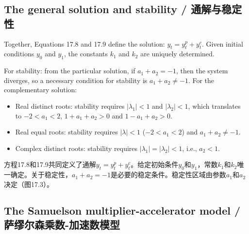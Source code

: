 \subsection{The general solution and stability / 通解与稳定性}

\begin{original}
Together, Equations 17.8 and 17.9 define the solution: $y_t = y_t^p + y_t^c$. Given initial conditions $y_0$ and $y_1$, the constants $k_1$ and $k_2$ are uniquely determined.

For stability: from the particular solution, if $a_1 + a_2 = -1$, then the system diverges, so a necessary condition for stability is $a_1 + a_2 \neq -1$. For the complementary solution:
\begin{itemize}
\item Real distinct roots: stability requires $|\lambda_1| < 1$ and $|\lambda_2| < 1$, which translates to $-2 < a_1 < 2$, $1 + a_1 + a_2 > 0$ and $1 - a_1 + a_2 > 0$.
\item Real equal roots: stability requires $|\lambda| < 1$ ($-2 < a_1 < 2$) and $a_1 + a_2 \neq -1$.
\item Complex distinct roots: stability requires $|\lambda_1| = |\lambda_2| < 1$, i.e., $a_2 < 1$.
\end{itemize}
\end{original}
\begin{translation}
方程17.8和17.9共同定义了通解$y_t = y_t^p + y_t^c$。给定初始条件$y_0$和$y_1$，常数$k_1$和$k_2$唯一确定。关于稳定性，$a_1 + a_2 = -1$是必要的稳定条件。稳定性区域由参数$a_1$和$a_2$决定（图17.3）。
\end{translation}

\subsection{The Samuelson multiplier-accelerator model / 萨缪尔森乘数-加速数模型}

